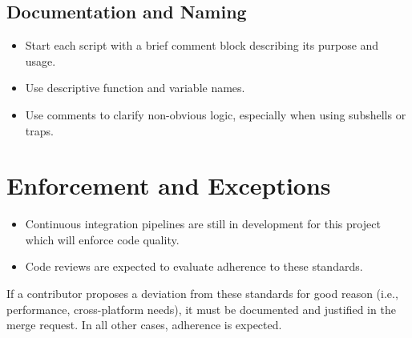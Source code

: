 \subsection{Documentation and Naming}
\begin{itemize}
    \item Start each script with a brief comment block describing its purpose and usage.
    \item Use descriptive function and variable names.
    \item Use comments to clarify non-obvious logic, especially when using subshells or traps.
\end{itemize}











\section{Enforcement and Exceptions}

\begin{itemize}
    \item Continuous integration pipelines are still in development for this project which will enforce code quality.
    \item Code reviews are expected to evaluate adherence to these standards.
\end{itemize}

If a contributor proposes a deviation from these standards for good reason (i.e., performance, cross-platform needs), it must be documented and justified in the merge request. In all other cases, adherence is expected.

